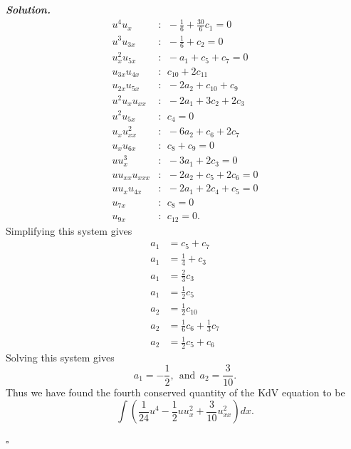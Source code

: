 \documentclass[12pt]{report}
\newenvironment{solution}[1][\it{Solution}]{\textbf{#1. } }{$\square$}
\newcommand{\paren}[1]{{\left(#1\right)}} %
\begin{document}
\begin{solution}
    \begin{align*}
        u^4u_x&: ~~ -\frac{1}{6} + \frac{30}{6}c_1 = 0\\
        u^3u_{3x}&: ~~ -\frac{1}{6} + c_2 = 0\\
        u_x^2u_{5x}&: ~~-a_1 + c_5 + c_7 = 0\\
        u_{3x}u_{4x}&: ~~c_{10}+2c_{11}\\
        u_{2x}u_{5x}&: ~~ -2a_2 + c_10 + c_9\\
        u^2u_xu_{xx}&: ~~ -2a_1 + 3c_2 + 2c_3\\
        u^2u_{5x}&: ~~ c_4 = 0\\
        u_xu_{xx}^2&: ~~ -6a_2 + c_6 + 2c_7\\
        u_xu_{6x}&: ~~ c_8 + c_9 = 0\\
        uu_x^3&: ~~ -3a_1 + 2c_3 = 0\\
        uu_{xx}u_{xxx}&: ~~ -2a_2 + c_5 + 2c_6 = 0\\
        uu_xu_{4x}&: ~~ -2a_1 + 2c_4 + c_5 = 0\\
        u_{7x}&: ~~ c_8 = 0\\
        u_{9x}&: ~~ c_{12} = 0. 
    \end{align*}
    Simplifying this system gives
    \begin{align*}
        a_1 &= c_5 + c_7\\
        a_1 &= \frac{1}{4} + c_3\\
        a_1 &= \frac{2}{3}c_3\\
        a_1 &= \frac{1}{2}c_5\\
        a_2 &= \frac{1}{2}c_{10}\\
        a_2 &= \frac{1}{6}c_6 + \frac{1}{3}c_7\\
        a_2 &= \frac{1}{2}c_5 + c_6
    \end{align*}
    Solving this system gives
    \[ 
        a_1 = -\frac{1}{2}, ~~\text{and}~~ a_2 = \frac{3}{10}.
    \]
    Thus we have found the fourth conserved quantity of the KdV equation to be
    \[ 
        \int \paren{\frac{1}{24}u^4 - \frac{1}{2}uu_x^2 + \frac{3}{10}u_{xx}^2}dx.
    \]

\end{solution}

\newpage


\end{document}
